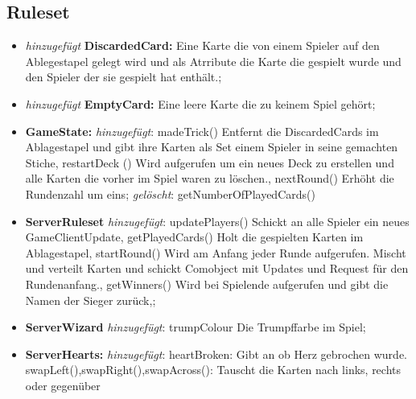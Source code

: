 \documentclass{article}
\begin{document}
\subsection{Ruleset}

\begin{itemize}
\item \textit{hinzugefügt} \textbf{DiscardedCard:} Eine Karte die von einem Spieler auf den Ablegestapel gelegt wird und als Atrribute die Karte die gespielt wurde und den Spieler der sie gespielt hat 
enthält.;

\item \textit{hinzugefügt} \textbf{EmptyCard:} Eine leere Karte die zu keinem Spiel gehört;

\item \textbf{GameState:} \textit{hinzugefügt}: madeTrick() Entfernt die DiscardedCards im Ablagestapel und gibt ihre Karten als Set einem Spieler in seine gemachten Stiche, restartDeck () Wird aufgerufen um ein neues Deck zu erstellen und alle Karten die vorher im Spiel waren zu löschen., nextRound() Erhöht die Rundenzahl um eins; \textit{gelöscht}: getNumberOfPlayedCards()

\item \textbf{ServerRuleset} \textit{hinzugefügt}: updatePlayers() Schickt an alle Spieler ein neues GameClientUpdate, getPlayedCards() Holt die gespielten Karten im Ablagestapel, startRound() Wird am Anfang jeder Runde aufgerufen. Mischt und verteilt Karten und schickt Comobject mit Updates und Request für den Rundenanfang., getWinners() Wird bei Spielende aufgerufen und gibt die Namen der Sieger zurück,; 

\item \textbf{ServerWizard} \textit{hinzugefügt}: trumpColour Die Trumpffarbe im Spiel; 

\item \textbf{ServerHearts:} \textit{hinzugefügt}: heartBroken: Gibt an ob Herz gebrochen wurde. swapLeft(),swapRight(),swapAcross(): Tauscht die Karten nach links, rechts oder gegenüber
\end{itemize}
\end{document}
